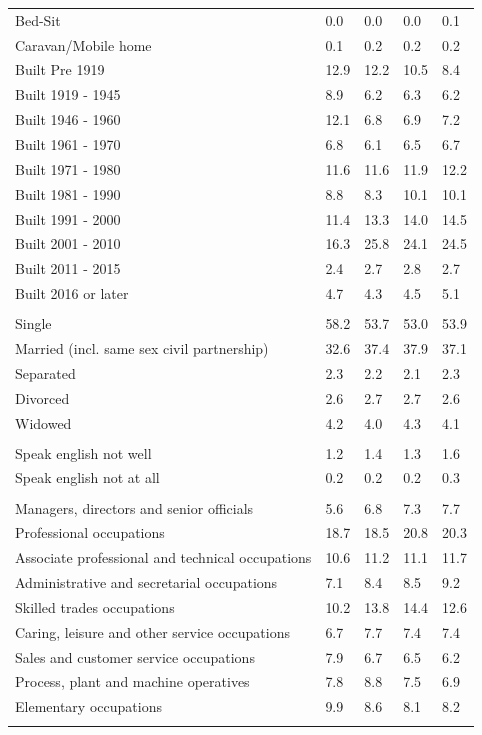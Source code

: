 \documentclass{article}
\begin{document}
\begin{table}[h]
\begin{tabular}{KTTTT}
Bed-Sit & 0.0& 0.0& 0.0& 0.1\\
Caravan/Mobile home & 0.1& 0.2& 0.2& 0.2\\
    \hline
Built Pre 1919 & 12.9& 12.2& 10.5&  8.4\\
Built 1919 - 1945 & 8.9& 6.2& 6.3& 6.2\\
Built  1946 - 1960 & 12.1&  6.8&  6.9&  7.2\\
Built  1961 - 1970 & 6.8& 6.1& 6.5& 6.7\\
Built  1971 - 1980 & 11.6& 11.6& 11.9& 12.2\\
Built  1981 - 1990 &  8.8&  8.3& 10.1& 10.1\\
Built  1991 - 2000 & 11.4& 13.3& 14.0& 14.5\\
Built  2001 - 2010 & 16.3& 25.8& 24.1& 24.5\\
Built  2011 - 2015 & 2.4& 2.7& 2.8& 2.7\\
Built  2016 or later & 4.7& 4.3& 4.5& 5.1\\
\hline
    \\
    \hline
Single & 58.2& 53.7& 53.0& 53.9\\
Married (incl. same sex civil partnership) & 32.6& 37.4& 37.9& 37.1\\
Separated  & 2.3& 2.2& 2.1& 2.3\\
Divorced  & 2.6& 2.7& 2.7& 2.6\\
Widowed & 4.2& 4.0& 4.3& 4.1\\
\hline
    \\ 
    \hline
Speak english not well & 1.2& 1.4& 1.3& 1.6\\
Speak english not at all & 0.2& 0.2& 0.2& 0.3\\
\hline
    \\
    \hline
Managers, directors and senior officials & 5.6& 6.8& 7.3& 7.7\\
Professional occupations & 18.7& 18.5& 20.8& 20.3\\
Associate professional and technical occupations & 10.6& 11.2& 11.1& 11.7\\
Administrative and secretarial occupations & 7.1& 8.4& 8.5& 9.2\\
Skilled trades occupations & 10.2& 13.8& 14.4& 12.6\\
Caring, leisure and other service occupations & 6.7& 7.7& 7.4& 7.4\\
Sales and customer service occupations & 7.9& 6.7& 6.5& 6.2\\
Process, plant and machine operatives & 7.8& 8.8& 7.5& 6.9\\
Elementary occupations & 9.9& 8.6& 8.1& 8.2\\
\hline
\end{tabular}
\end{table}
\end{document}
